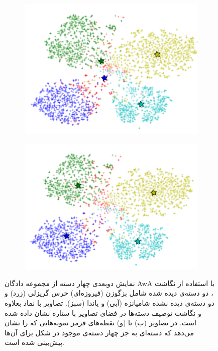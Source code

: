\begin{figure}[t]
\begin{subfigure}[b]{0.38\linewidth}
    \includegraphics[width=\linewidth]{images/own_cluster}
    \caption{}
    \label{fig:clustering}
  \end{subfigure}
%
  \begin{subfigure}[b]{0.38\linewidth}
    \includegraphics[width=\linewidth]{images/jeac}
    \caption{}
    \label{fig:jeac}
  \end{subfigure}
  \caption[تحلیل قسمت‌های مختلف روش پیشنهادی]{
  نمایش دوبعدی چهار دسته از مجموعه دادگان AwA با استفاده از نگاشت ، دو دسته‌ی دیده شده شامل بزگوزن (فیروزه‌ای) خرس گریزلی (زرد) و دو دسته‌ی دیده نشده شامپانزه (آبی) و پاندا (سبز). تصاویر با نماد بعلاوه و نگاشت توصیف دسته‌ها در فضای تصاویر با ستاره نشان داده شده است. در تصاویر (ب) تا (و) نقطه‌های قرمز نمونه‌هایی که را نشان می‌دهد که دسته‌ای به جز چهار دسته‌ی موجود در شکل برای آن‌ها پیش‌بینی شده است.
}
\end{figure}
